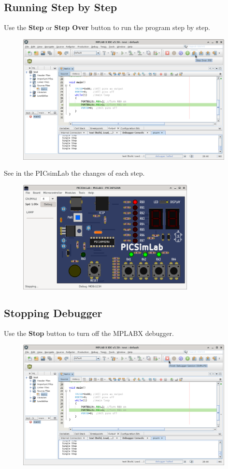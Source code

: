\subsection{Running Step by Step}
Use the \textbf{Step} or \textbf{Step Over} button to run the program step by step.
\begin{figure}[H]
\center
\includegraphics[width=0.98\textwidth]{img/hmd/mplab28.png} 
\end{figure} 

See in the PICsimLab the changes of each step.
\begin{figure}[H]
\center
\includegraphics[width=0.8\textwidth]{img/hmd/mplab29.png} 
\end{figure} 

\subsection{Stopping Debugger}
Use the \textbf{Stop} button to turn off the MPLABX debugger. 
\begin{figure}[H]
\center
\includegraphics[width=0.98\textwidth]{img/hmd/mplab30.png} 
\end{figure} 

